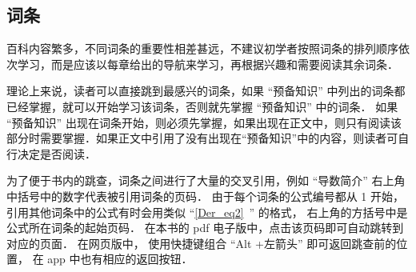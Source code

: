 \subsection{词条}
百科内容繁多，不同词条的重要性相差甚远，不建议初学者按照词条的排列顺序依次学习，而是应该以每章给出的导航来学习，再根据兴趣和需要阅读其余词条．

理论上来说，读者可以直接跳到最感兴的词条，如果 “预备知识” 中列出的词条都已经掌握，就可以开始学习该词条，否则就先掌握 “预备知识” 中的词条． 如果 “预备知识” 出现在词条开始，则必须先掌握，如果出现在正文中，则只有阅读该部分时需要掌握．如果正文中引用了没有出现在“预备知识”中的内容，则读者可自行决定是否阅读．

为了便于书内的跳查，词条之间进行了大量的交叉引用，例如 “导数简介” 右上角中括号中的数字代表被引用词条的页码． 由于每个词条的公式编号都从 1 开始， 引用其他词条中的公式有时会用类似 “\autoref{Der_eq2}~” 的格式， 右上角的方括号中是公式所在词条的起始页码． 在本书的 pdf 电子版中，点击该页码即可自动跳转到对应的页面． 在网页版中， 使用快捷键组合 “Alt +左箭头” 即可返回跳查前的位置， 在 app 中也有相应的返回按钮．
